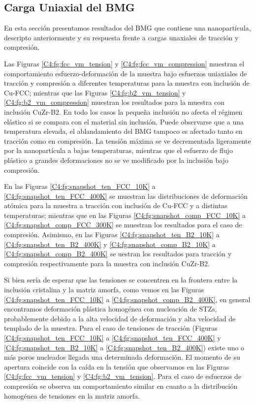 \subsection{Carga Uniaxial del BMG}
\label{S4_2_2}

En esta sección presentamos resultados del BMG que contiene una nanopartícula, descripto anteriormente y su respuesta frente a cargas unaxiales de tracción y compresión.

Las Figuras \ref{C4:fg:fcc_vm_tension} y \ref{C4:fg:fcc_vm_compression} muestran el comportamiento esfuerzo-deformación de la muestra bajo esfuerzos uniaxiales de tracción y compresión a diferentes temperaturas para la muestra con inclusión de Cu-FCC; mientras que las Figuras \ref{C4:fg:b2_vm_tension} y \ref{C4:fg:b2_vm_compression} muestran los resultados para la muestra con inclusión CuZr-B2. En todo los casos la pequeña inclusión no afecta el régimen elástico si se compara con el material sin inclusión. Puede observarse que a una temperatura elevada, el ablandamiento del BMG tampoco es afectado tanto en tracción como en compresión. La tensión máxima se ve decrementada ligeramente por la nanopartícula a bajas temperaturas, mientras que el esfuerzo de flujo plástico a grandes deformaciones no se ve modificado por la inclusión bajo compresión.

En las Figuras \ref{C4:fg:snapshot_ten_FCC_10K} a \ref{C4:fg:snapshot_ten_FCC_400K} se muestran las distribuciones de deformación atómica para la muestra a tracción con inclusión de Cu-FCC y a distintas temperaturas; mientras que en las Figuras \ref{C4:fg:snapshot_comp_FCC_10K} a \ref{C4:fg:snapshot_comp_FCC_300K} se muestran los resultados para el caso de compresión. Asimismo, en las Figuras \ref{C4:fg:snapshot_ten_B2_10K} a \ref{C4:fg:snapshot_ten_B2_400K} y \ref{C4:fg:snapshot_comp_B2_10K} a \ref{C4:fg:snapshot_comp_B2_400K} se uestran los resultados para tracción y compresión respectivamente para la muestra con inclusión CuZr-B2.

Si bien sería de esperar que las tensiones se concentren en la frontera entre la inclusión cristalina y la matriz amorfa, como vemos en las Figuras \ref{C4:fg:snapshot_ten_FCC_10K} a \ref{C4:fg:snapshot_comp_B2_400K}, en general encontramos deformación plástica homogénea con nucleación de STZs, probablemente debido a la alta velocidad de deformación y alta velocidad de templado de la muestra. Para el caso de tensiones de tracción (Figuras \ref{C4:fg:snapshot_ten_FCC_10K} a \ref{C4:fg:snapshot_ten_FCC_400K} y \ref{C4:fg:snapshot_ten_B2_10K} a \ref{C4:fg:snapshot_ten_B2_400K}) existe uno o más poros nucleados llegada una determinada deformación. El momento de su apertura coincide con la caída en la tensión que observamos en las Figuras \ref{C4:fg:fcc_vm_tension} y \ref{C4:fg:b2_vm_tension}. Para el caso de esfuerzos de compresión se observa un comportamiento similar en cuanto a la distribución homogénea de tensiones en la matriz amorfa.

